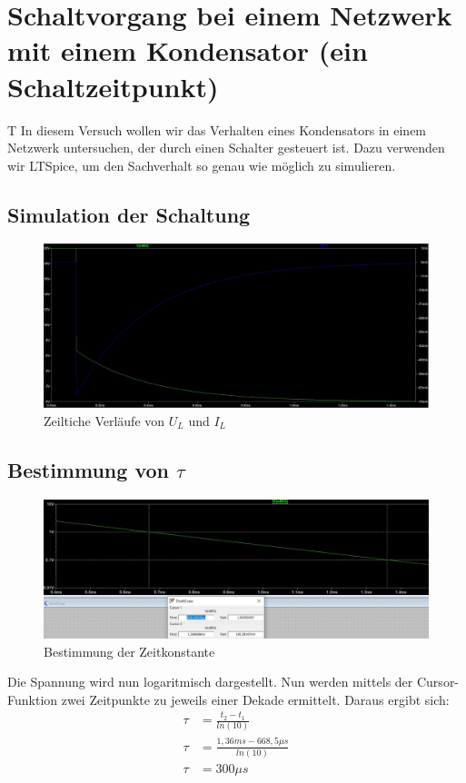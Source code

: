 \documentclass{article}
\begin{document}
\newpage

\section{Schaltvorgang bei einem Netzwerk mit einem Kondensator (ein Schaltzeitpunkt)}
\begin{task}
  T
  In diesem Versuch wollen wir das Verhalten eines Kondensators in einem Netzwerk untersuchen, der durch einen Schalter gesteuert ist. Dazu verwenden wir LTSpice, um den Sachverhalt so genau wie möglich zu simulieren.
\end{task}
\subsection{Simulation der Schaltung}
\begin{figure}[h]
  \begin{center}
    \includegraphics[scale=0.4]{../assets/images/ET2P5/aufgabe 2 u von t und i von t.JPG}
    \caption{Zeiltiche Verläufe von $U_L$ und $I_L$}
  \end{center}
\end{figure}

\subsection{Bestimmung von $\tau$}

\begin{figure}[h]
  \begin{center}
    \includegraphics[scale=0.5]{../assets/images/ET2P5/tau log aufgabe 2.JPG}
    \caption{Bestimmung der Zeitkonstante}
  \end{center}
\end{figure}
Die Spannung wird nun logaritmisch dargestellt. Nun werden mittels der Cursor-Funktion zwei Zeitpunkte zu jeweils einer Dekade ermittelt.
Daraus ergibt sich:
\begin{align*}
  \tau &= \frac{t_2-t_1}{ln(10)}\\
  \tau &= \frac{1,36ms - 668,5\mu s}{ln (10)}\\
  \tau &= 300\mu s
\end{align*}
\end{document}
